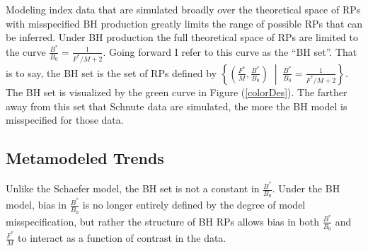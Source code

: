 %
Modeling index data that are simulated broadly over the theoretical space of RPs
with misspecified BH production greatly limits the range of possible RPs that
can be inferred. Under BH production the full theoretical space of RPs are
limited to the curve \mbox{$\frac{B^*}{B_0}=\frac{1}{F^*/M+2}$.} Going forward I refer to 
this curve as the ``BH set''. That is to say, the BH set is the set of RPs defined by
$\left\{\left(\frac{F^*}{M}, \frac{B^*}{B_0}\right) \;\middle|\; \frac{B^*}{B_0}=\frac{1}{F^*/M+2}\right\}$. 
The BH set is visualized by the green curve in Figure (\ref{colorDes}).
The farther away from this set that Schnute data are simulated, the more the
BH model is misspecified for those data.

%
\subsection{Metamodeled Trends \label{sMeta}}

%
Unlike the Schaefer model, the BH set is not a constant in
$\frac{B^*}{B_0}$. %
Under the BH model, bias in $\frac{B^*}{B_0}$ is no longer entirely defined by the degree of model 
misspecification, but rather the structure of BH RPs allows bias in both $\frac{B^*}{B_0}$ 
and $\frac{F^*}{M}$ to interact as a function of contrast in the data.


